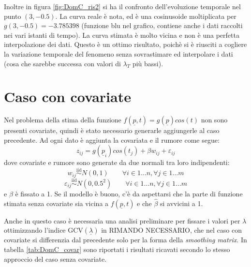 \documentclass[a4paper,11pt,twoside,openright]{book}							%
\begin{document}
Inoltre in figura \ref{fig:DomC_ris2} si ha il confronto dell'evoluzione temporale nel punto $(3,-0.5)$. La curva reale è nota, ed è una cosinusoide moltiplicata per $g(3,-0.5)=-3.785398$ (funzione blu nel grafico, contiene anche i dati raccolti nei vari istanti di tempo). La curva stimata è molto vicina e non è una perfetta interpolazione dei dati. Questo è un ottimo risultato, poichè si è riusciti a cogliere la variazione temporale del fenomeno senza sovrastimare ed interpolare i dati (cosa che sarebbe successa con valori di $\lambda_T$ più bassi).



\section{Caso con covariate}
Nel problema della stima della funzione $f(\underline p,t)=g(\underline p)cos(t)$ non sono presenti covariate, quindi è stato necessario generarle aggiungerle al caso precedente. Ad ogni dato è aggiunta la covariata e il rumore come segue:
$$
z_{ij}=g(\underline p_{i})cos(t_j) + \beta w_{ij} + \varepsilon_{ij}
$$
dove covariate e rumore sono generate da due normali tra loro indipendenti:
$$
w_{ij}\stackrel{\mathrm{iid}}{\sim}N(0,1) \qquad \forall i \in 1\ldots n, \forall j \in 1\ldots m
$$
$$
\varepsilon_{ij}\stackrel{\mathrm{iid}}{\sim}N(0,0.5^2) \qquad \forall i \in 1\ldots n, \forall j \in 1\ldots m
$$
e $\beta$ è fissato a 1. Se il modello è buono, c'è da aspettarsi che la parte di funzione stimata senza covariate sia vicina a $f(\underline p,t)$ e che $\hat{\beta}$ si avvicini a 1.
 
Anche in questo caso è necessaria una analisi preliminare per fissare i valori per $\lambda$ ottimizzando l'indice $\mathrm{GCV}(\underline \lambda)$ in RIMANDO NECESSARIO, che nel caso con covariate si differenzia dal precedente solo per la forma della \textit{smoothing matrix}. In tabella \ref{tab:DomC_covar} sono riportati i risultati ricavati secondo lo stesso approccio del caso senza covariate.
\end{document}
